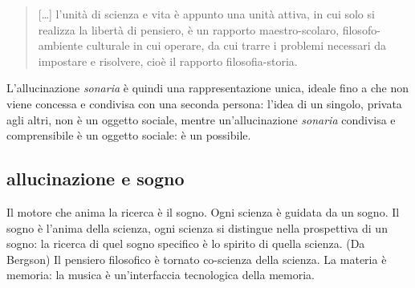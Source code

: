 \documentclass{../../lib/gs}
\begin{document}
\begin{quote}
  [\ldots] l'unità di scienza e vita è appunto una unità attiva, in cui solo si
  realizza la libertà di pensiero, è un rapporto maestro-scolaro,
  filosofo-ambiente culturale in cui operare, da cui trarre i problemi necessari
  da impostare e risolvere, cioè il rapporto filosofia-storia. \cite{ag:matst}
\end{quote}%

%

L'allucinazione \emph{sonaria} è quindi una rappresentazione unica, ideale fino
a che non viene concessa e condivisa con una seconda persona: l'idea di un
singolo, privata agli altri, non è un oggetto sociale, mentre un'allucinazione
\emph{sonaria} condivisa e comprensibile è un oggetto sociale: è un possibile.
\cite{ferraris2014}
\subsection{allucinazione e sogno}

Il motore che anima la ricerca è il sogno. Ogni scienza è guidata da un sogno.
Il sogno è l'anima della scienza, ogni scienza si distingue nella prospettiva di
un sogno: la ricerca di quel sogno specifico è lo spirito di quella scienza.
(Da Bergson) Il pensiero filosofico è tornato co-scienza della scienza. La
materia è memoria: la musica è un'interfaccia tecnologica della memoria.
\end{document}
